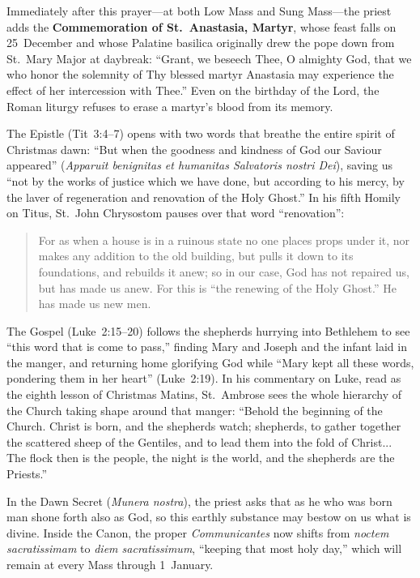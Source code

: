 Immediately after this prayer---at both Low Mass and Sung Mass---the priest adds
the \textbf{Commemoration of St.~Anastasia, Martyr}, whose feast falls on
25~December and whose Palatine basilica originally drew the pope down from
St.~Mary Major at daybreak: ``Grant, we beseech Thee, O almighty God, that we
who honor the solemnity of Thy blessed martyr Anastasia may experience the
effect of her intercession with Thee.'' Even on the birthday of the Lord, the
Roman liturgy refuses to erase a martyr's blood from its memory.

The Epistle (Tit~3:4--7) opens with two words that breathe the entire spirit of
Christmas dawn: ``But when the goodness and kindness of God our Saviour
appeared'' (\textit{Apparuit benignitas et humanitas Salvatoris nostri Dei}),
saving us ``not by the works of justice which we have done, but according to his
mercy, by the laver of regeneration and renovation of the Holy Ghost.'' In his
fifth Homily on Titus, St.~John Chrysostom pauses over that word
``renovation'':

\begin{quote}
For as when a house is in a ruinous state no one places props under it, nor
makes any addition to the old building, but pulls it down to its foundations,
and rebuilds it anew; so in our case, God has not repaired us, but has made us
anew. For this is ``the renewing of the Holy Ghost.'' He has made us new men.
\end{quote}

The Gospel (Luke~2:15--20) follows the shepherds hurrying into Bethlehem to see
``this word that is come to pass,'' finding Mary and Joseph and the infant laid
in the manger, and returning home glorifying God while ``Mary kept all these
words, pondering them in her heart'' (Luke~2:19). In his commentary on Luke,
read as the eighth lesson of Christmas Matins, St.~Ambrose sees the whole
hierarchy of the Church taking shape around that manger: ``Behold the beginning
of the Church. Christ is born, and the shepherds watch; shepherds, to gather
together the scattered sheep of the Gentiles, and to lead them into the fold of
Christ... The flock then is the people, the night is the world, and the
shepherds are the Priests.''

In the Dawn Secret (\textit{Munera nostra}), the priest asks that as he who was
born man shone forth also as God, so this earthly substance may bestow on us
what is divine. Inside the Canon, the proper \textit{Communicantes} now
shifts from \textit{noctem sacratissimam} to \textit{diem sacratissimum},
``keeping that most holy day,'' which will remain at every Mass through
1~January.

